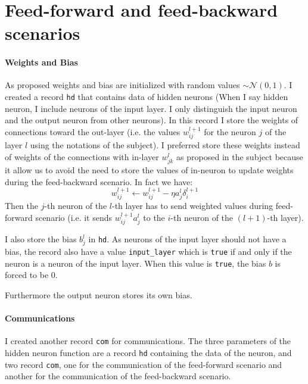 \documentclass[12pt]{article}
\begin{document}
\section{Feed-forward and feed-backward scenarios}

\paragraph{Weights and Bias}
As proposed weights and bias are initialized with random values $\sim \mathcal{N}(0, 1)$. I created a record \verb|hd| that contains data of hidden neurons (When I say hidden neuron, I include neurons of the input layer. I only distinguish the input neuron and the output neuron from other neurons). In this record I store the weights of connections toward the out-layer (i.e. the values $w_{ij}^{l+1}$ for the neuron $j$ of the layer $l$ using the notations of the subject). I preferred store these weights instead of weights of the connections with in-layer $w_{jk}^l$ as proposed in the subject because it allow us to avoid the need to store the values of in-neuron to update weights during the feed-backward scenario. In fact we have:
$$ w_{ij}^{l+1} \gets w_{ij}^{l+1} - \eta a_j^l \delta_i^{l+1} $$
Then the $j$-th neuron of the $l$-th layer has to send weighted values during feed-forward scenario (i.e. it sends $w_{ij}^{l+1} a_j^l$ to the $i$-th neuron of the $(l+1)$-th layer).

I also store the bias $b_j^l$ in \verb|hd|. As neurons of the input layer should not have a bias, the record also have a value \verb|input_layer| which is \verb|true| if and only if the neuron is a neuron of the input layer. When this value is \verb|true|, the bias $b$ is forced to be 0.

Furthermore the output neuron stores its own bias.

\paragraph{Communications}
I created another record \verb|com| for communications. The three parameters of the hidden neuron function are a record \verb|hd| containing the data of the neuron, and two record \verb|com|, one for the communication of the feed-forward scenario and another for the communication of the feed-backward scenario.
\end{document}

